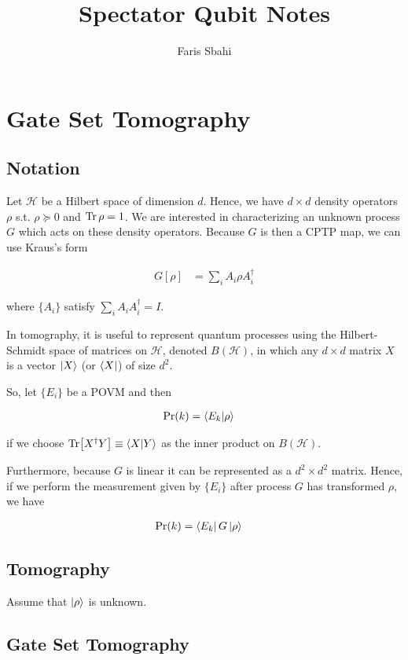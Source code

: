 \documentclass[12]{article}
\title{Spectator Qubit Notes}
\author{Faris Sbahi}
\newcommand\0{\mathbf{0}}
\newcommand\<{\langle}
\renewcommand\>{\rangle}
\begin{document}
\maketitle

\section{Gate Set Tomography}

\subsection{Notation}

Let $\mathcal{H}$ be a Hilbert space of dimension $d$. Hence, we have $d \times d$ density operators $\rho$ s.t. $\rho \succeq 0$ and $\Tr \rho = 1$. We are interested in characterizing an unknown process $G$ which acts on these density operators. Because $G$ is then a CPTP map, we can use Kraus's form

\begin{align*}
G[\rho] &= \sum_i A_i \rho A_i^\dag 	
\end{align*}

where $\{A_i\}$ satisfy $\sum_i A_i A_i^\dag = I$.

In tomography, it is useful to represent quantum processes using the Hilbert-Schmidt space of matrices on $\mathcal{H}$, denoted $B(\mathcal{H})$, in which any $d \times d$ matrix $X$ is a vector $\ket{X}$ (or $\bra{X}$) of size $d^2$.

So, let $\{E_i\}$ be a POVM and then

\begin{align*}
\Pr(k) &= \bra{E_k}\ket{\rho}
\end{align*}

if we choose $\Tr[X^\dag Y] \equiv \bra{X}\ket{Y}$ as the inner product on $B(\mathcal{H})$.

Furthermore, because $G$ is linear it can be represented as a $d^2 \times d^2$ matrix. Hence, if we perform the measurement given by $\{E_i\}$ after process $G$ has transformed $\rho$, we have

\begin{align*}
\Pr(k) &= \bra{E_k}G\ket{\rho}
\end{align*}

\subsection{Tomography}

Assume that $\ket{\rho}$ is unknown.

\subsection{Gate Set Tomography}
\end{document}
